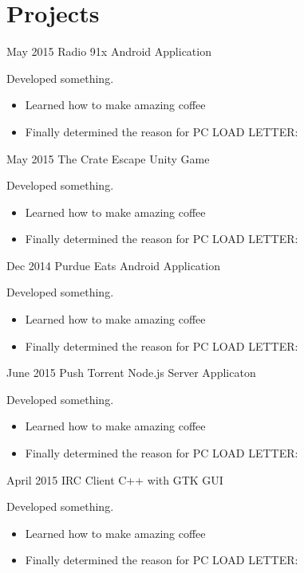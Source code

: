 \documentclass[]{friggeri-cv} %
\begin{document}
\section{Projects}

\begin{entrylist}


\entry
{May 2015}
{Radio 91x}
{Android Application}
{Developed something.
\begin{itemize}
\item Learned how to make amazing coffee
\item Finally determined the reason for \textsc{PC LOAD LETTER}:
\end{itemize}}


\entry
{May 2015}
{The Crate Escape}
{Unity Game}
{Developed something.
\begin{itemize}
\item Learned how to make amazing coffee
\item Finally determined the reason for \textsc{PC LOAD LETTER}:
\end{itemize}}


\entry
{Dec 2014}
{Purdue Eats}
{Android Application}
{Developed something.
\begin{itemize}
\item Learned how to make amazing coffee
\item Finally determined the reason for \textsc{PC LOAD LETTER}:
\end{itemize}}


\entry
{June 2015}
{Push Torrent}
{Node.js Server Applicaton}
{Developed something.
\begin{itemize}
\item Learned how to make amazing coffee
\item Finally determined the reason for \textsc{PC LOAD LETTER}:
\end{itemize}}


\entry
{April 2015}
{IRC Client}
{C++ with GTK GUI}
{Developed something.
\begin{itemize}
\item Learned how to make amazing coffee
\item Finally determined the reason for \textsc{PC LOAD LETTER}:
\end{itemize}}

\end{entrylist}
\end{document}
